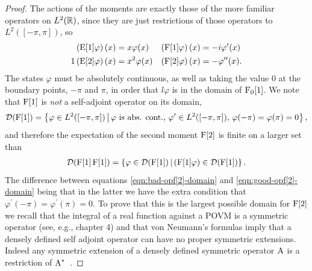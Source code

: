 \begin{proof}
The actions of the moments are exactly those of the more familiar operators on $L^2(\mathbb{R})$, since they are just restrictions of those operators to $L^2([-\pi,\pi])$, so
\begin{align}
  \left(\operatorname{E}[1]\varphi\right)(x) &= x\varphi(x) & \left(\operatorname{F}[1]\varphi\right)(x) &= -i\varphi^\prime(x)\\
1  \left(\operatorname{E}[2]\varphi\right)(x) &= x^2\varphi(x) & \left(\operatorname{F}[2]\varphi\right)(x) &= -\varphi^{\prime\prime}(x). 
\end{align}
The states $\varphi$ must be absolutely continuous, as well as taking the value $0$ at the boundary points, $-\pi$ and $\pi$, in order that $l\varphi$ is in the domain of $\operatorname{F}_0[1]$. We note that $\operatorname{F}[1]$ is \emph{not} a self-adjoint operator on its domain,
\begin{align}
  \mathcal{D}(\operatorname{F}[1]) = \left\{\varphi\in L^2([-\pi,\pi])\, \middle|\, \varphi \text{ is abs. cont., } \varphi^\prime\in L^2([-\pi,\pi]),\, \varphi(-\pi) = \varphi(\pi) = 0\right\},
\end{align}
and therefore the expectation of the second moment $\operatorname{F}[2]$ is finite on a larger set than 
\begin{align}\label{eqn:bad-opf[2]-domain}
  \mathcal{D}(\operatorname{F}[1]\operatorname{F}[1]) = \left\{\varphi\in\mathcal{D}(\operatorname{F}[1])\,\middle|\,\left(\operatorname{F}[1]\varphi\right)\in\mathcal{D}(\operatorname{F}[1])\right\}.
\end{align}
The difference between equations \eqref{eqn:bad-opf[2]-domain} and \eqref{eqn:good-opf[2]-domain} being that in the latter we have the extra condition that $\varphi^\prime(-\pi) = \varphi^\prime(\pi) = 0$. To prove that this is the largest possible domain for $\operatorname{F}[2]$ we recall that the integral of a real function against a POVM is a symmetric operator (see, e.g., \cite{quantum-measurement-busch-et-al} chapter 4) and that von Neumann's formulas imply that a densely defined self adjoint operator can have no proper symmetric extensions. Indeed any symmetric extension of a densely defined symmetric operator $\operatorname{A}$ is a restriction of $\operatorname{A}^*$~\cite{akhiezer-glazman-lin-ops-hilb-space}.


\end{proof}
